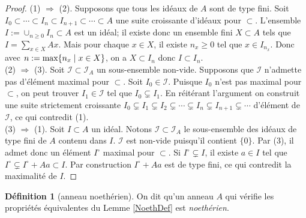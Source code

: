 \documentclass[a4paper, oneside, 12pt]{book}
\theoremstyle{theoremeStyle} %
\theoremstyle{definition} %
\newtheorem{definition}[theoreme]{Définition}
\begin{document}
\begin{proof} (1) $\Rightarrow$ (2). Supposons que tous les idéaux de $A$ sont de type fini. Soit $I_0\subset\cdots\subset I_n\subset I_{n+1}\subset \cdots\subset A$ une suite croissante d'idéaux pour $\subset $. L'ensemble $I:=\cup_{n\geq 0}I_n\subset A$ est un idéal; il existe donc un ensemble fini $X\subset A$ tels que $I=\sum_{x\in X}Ax$. Mais pour chaque $x\in X$, il existe $n_x\geq 0$ tel que $x\in I_{n_x}$. Donc avec $n:=\hbox{\rm max}\lbrace n_x\;|\; x\in X\rbrace$, on a $X\subset I_n$ donc $I\subset I_n$. \\
 (2) $\Rightarrow$ (3). Soit $\mathcal{I}\subset \mathcal{I}_A$ un sous-ensemble non-vide. Supposons que $\mathcal{I}$ n'admette pas d'élément maximal pour $\subset$. Soit $I_0\in \mathcal{I}$. Puisque $I_0$ n'est pas maximal pour $\subset$, on peut  trouver $I_1\in \mathcal{I}$ tel que $I_0\subsetneq I_1$. En réitérant l'argument on construit une suite strictement croissante $I_0\subsetneq I_1\subsetneq I_2\subsetneq\cdots\subsetneq I_n\subsetneq I_{n+1}\subsetneq \cdots$ d'élément de $\mathcal{I}$, ce qui contredit (1).\\
 (3) $\Rightarrow$ (1). Soit $I\subset A$ un idéal. Notons $\mathcal{I}\subset \mathcal{I}_A$ le sous-ensemble des idéaux de type fini de $A$ contenu dans $I$. $\mathcal{I}$ est non-vide puisqu'il contient $\lbrace 0\rbrace$. Par (3), il admet donc un élément $I^\circ$ maximal pour $\subset$. Si $I^\circ\subsetneq I$, il existe $a\in I$ tel que $I^\circ\subsetneq I^\circ+Aa\subset I$. Par construction $I^\circ+Aa$ est de type fini, ce qui contredit la maximalité de $I$.\end{proof}

\begin{definition}[anneau noethérien]
  On dit qu'un anneau $A$ qui vérifie les propriétés équivalentes du Lemme \ref{NoethDef} est \textit{noethérien}.
\end{definition}
\end{document}
